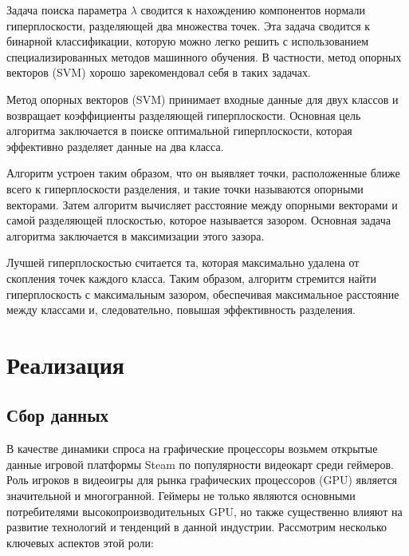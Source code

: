 \documentclass[14pt, a4paper]{extarticle}
\begin{document}
Задача поиска параметра \( \lambda \) сводится к нахождению компонентов нормали гиперплоскости, разделяющей два множества точек. Эта задача сводится к бинарной классификации, которую можно легко решить с использованием специализированных методов машинного обучения. В частности, метод опорных векторов (SVM) хорошо зарекомендовал себя в таких задачах.

Метод опорных векторов (SVM) принимает входные данные для двух классов и возвращает коэффициенты разделяющей гиперплоскости. Основная цель алгоритма заключается в поиске оптимальной гиперплоскости, которая эффективно разделяет данные на два класса.

Алгоритм устроен таким образом, что он выявляет точки, расположенные ближе всего к гиперплоскости разделения, и такие точки называются опорными векторами. Затем алгоритм вычисляет расстояние между опорными векторами и самой разделяющей плоскостью, которое называется зазором. Основная задача алгоритма заключается в максимизации этого зазора.

Лучшей гиперплоскостью считается та, которая максимально удалена от скопления точек каждого класса. Таким образом, алгоритм стремится найти гиперплоскость с максимальным зазором, обеспечивая максимальное расстояние между классами и, следовательно, повышая эффективность разделения.


  \section{Реализация}
  \subsection{Сбор данных}
  В качестве динамики спроса на графические процессоры возьмем открытые данные игровой платформы Steam по популярности видеокарт среди геймеров.
  Роль игроков в видеоигры для рынка графических процессоров (GPU) является значительной и многогранной. Геймеры не только являются основными потребителями высокопроизводительных GPU, но также существенно влияют на развитие технологий и тенденций в данной индустрии. Рассмотрим несколько ключевых аспектов этой роли:
\end{document}
